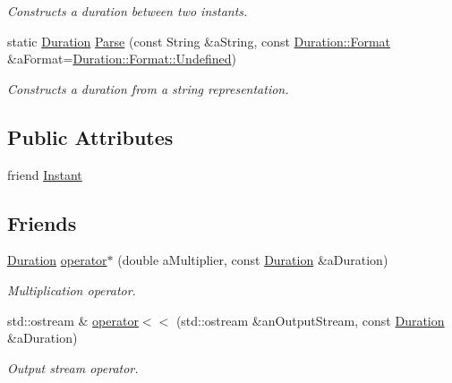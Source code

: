 \begin{DoxyCompactItemize}
\begin{DoxyCompactList}\small\item\em Constructs a duration between two instants. \end{DoxyCompactList}\item 
static \hyperlink{classlibrary_1_1physics_1_1time_1_1_duration}{Duration} \hyperlink{classlibrary_1_1physics_1_1time_1_1_duration_a52ba6dd2958d1e193b81d8f659bb6bf3}{Parse} (const String \&a\+String, const \hyperlink{classlibrary_1_1physics_1_1time_1_1_duration_ace85659cafe97df992c0e4273bdc88d1}{Duration\+::\+Format} \&a\+Format=\hyperlink{classlibrary_1_1physics_1_1time_1_1_duration_ace85659cafe97df992c0e4273bdc88d1aec0fc0100c4fc1ce4eea230c3dc10360}{Duration\+::\+Format\+::\+Undefined})
\begin{DoxyCompactList}\small\item\em Constructs a duration from a string representation. \end{DoxyCompactList}\end{DoxyCompactItemize}
\subsection*{Public Attributes}
\begin{DoxyCompactItemize}
\item 
friend \hyperlink{classlibrary_1_1physics_1_1time_1_1_duration_ac98d9996643dde64fe1ffe67c12cc945}{Instant}
\end{DoxyCompactItemize}
\subsection*{Friends}
\begin{DoxyCompactItemize}
\item 
\hyperlink{classlibrary_1_1physics_1_1time_1_1_duration}{Duration} \hyperlink{classlibrary_1_1physics_1_1time_1_1_duration_a30be5772f32cb400f8d8a8e2975abf6d}{operator$\ast$} (double a\+Multiplier, const \hyperlink{classlibrary_1_1physics_1_1time_1_1_duration}{Duration} \&a\+Duration)
\begin{DoxyCompactList}\small\item\em Multiplication operator. \end{DoxyCompactList}\item 
std\+::ostream \& \hyperlink{classlibrary_1_1physics_1_1time_1_1_duration_a82573aea35c8642b571f78c85ca70fbc}{operator$<$$<$} (std\+::ostream \&an\+Output\+Stream, const \hyperlink{classlibrary_1_1physics_1_1time_1_1_duration}{Duration} \&a\+Duration)
\begin{DoxyCompactList}\small\item\em Output stream operator. \end{DoxyCompactList}\end{DoxyCompactItemize}


